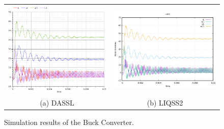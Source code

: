 \documentclass[10pt]{article}
\begin{document}
    \begin{figure}[htbp]\centering
		\begin{tabular}{cc}

   \includegraphics[scale=0.45]{./Fig/con-om.png}&\includegraphics[scale=0.45]{./Fig/con-liqss.png}\\(a) DASSL&(b) LIQSS2
    \end{tabular}
\vspace{-0.2cm}
\caption{Simulation results of the Buck Converter.}\label{Fig1}
\end{figure}
\end{document}
